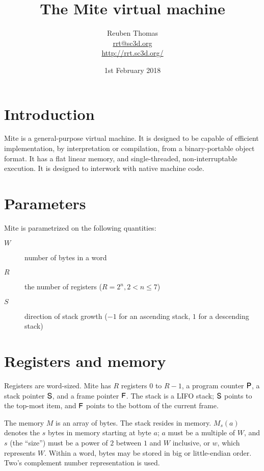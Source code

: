 \documentclass[english]{scrartcl}
\newcommand{\synfont}{\sffamily}
\newcommand{\syn}[1]{\ensuremath{\text{\synfont #1}}}
\begin{document}
\title{The Mite virtual machine}
\author{Reuben Thomas\\\url{rrt@sc3d.org}\\\url{http://rrt.sc3d.org/}}
\date{1st February 2018} \maketitle %



\section{Introduction}

Mite is a general-purpose virtual machine. It is designed to be
capable of efficient implementation, by interpretation or compilation,
from a binary-portable object format. It has a flat linear memory, and
single-threaded, non-interruptable execution. It is designed to
interwork with native machine code.



\section{Parameters}

Mite is parametrized on the following quantities:

\begin{description}
\item[$W$]number of bytes in a word

\item[$R$]the number of registers ($R=2^n, 2<n\leq 7$)

\item[$S$]direction of stack growth ($-1$ for an ascending stack, $1$
  for a descending stack)
\end{description}



\section{Registers and memory}

Registers are word-sized. Mite has $R$ registers $0$ to $R-1$, a
program counter \syn{P}, a stack pointer \syn{S}, and a frame pointer
\syn{F}. The stack is a LIFO stack; \syn{S} points to the top-most
item, and \syn{F} points to the bottom of the current frame.

The memory $M$ is an array of bytes. The stack resides in memory.
$M_s(a)$ denotes the $s$ bytes in memory starting at byte $a$; $a$
must be a multiple of $W$, and $s$ (the ``size'') must be a power of
$2$ between $1$ and $W$ inclusive, or $w$, which represents $W$.
Within a word, bytes may be stored in big or little-endian order.
Two's complement number representation is used.
\end{document}
